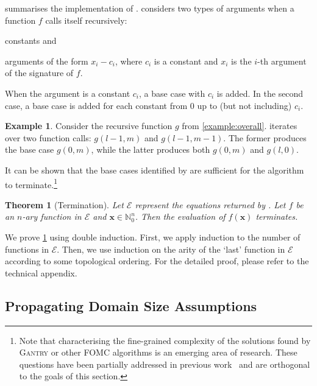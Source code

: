 \documentclass[letterpaper]{article} %
\newtheorem{theorem}{Theorem}
\theoremstyle{remark}
\theoremstyle{definition}
\newtheorem{example}{Example}
\newcommand{\Cranetwo}{\textsc{Gantry}}
\begin{document}
 summarises the implementation of \FindBaseCases.
\FindBaseCases considers two types of arguments when a function $f$ calls itself
recursively:
\begin{enumerate*}[label=(\roman*)]
  \item constants and
  \item arguments of the form $x_{i} - c_{i}$, where $c_{i}$ is a constant and
  $x_{i}$ is the $i$-th argument of the signature of $f$.
\end{enumerate*}
When the argument is a constant $c_{i}$, a base case with $c_{i}$ is added. In
the second case, a base case is added for each constant from $0$ up to (but not
including) $c_{i}$.

\begin{example}
  Consider the recursive function $g$ from \cref{example:overall}.
  \FindBaseCases iterates over two function calls: $g(l-1, m)$ and
  $g(l-1, m-1)$. The former produces the base case $g(0, m)$, while the latter
  produces both $g(0, m)$ and $g(l, 0)$.
\end{example}

It can be shown that the base cases identified by \FindBaseCases are sufficient
for the algorithm to terminate.\footnote{Note that characterising the
  fine-grained complexity of the solutions found by \Cranetwo{} or other FOMC
  algorithms is an emerging area of research. These questions have been
  partially addressed in previous
  work~\cite{DBLP:conf/kr/DilkasB23,tóth2024complexityweightedfirstordermodel}
  and are orthogonal to the goals of this section.}

\begin{theorem}[Termination]\label{thm:halting}
  Let $\mathcal{E}$ represent the equations returned by \CompileWithBaseCases.
  Let $f$ be an $n$-ary function in $\mathcal{E}$ and
  $\mathbf{x} \in \mathbb{N}_{0}^{n}$. Then the evaluation of $f(\mathbf{x})$
  terminates.
\end{theorem}

We prove \cref{thm:halting} using double induction. First, we apply induction to
the number of functions in $\mathcal{E}$. Then, we use induction on the arity of
the `last' function in $\mathcal{E}$ according to some topological ordering. For
the detailed proof, please refer to the technical appendix.

\subsection{Propagating Domain Size Assumptions}\label{sec:propagating}
\end{document}
